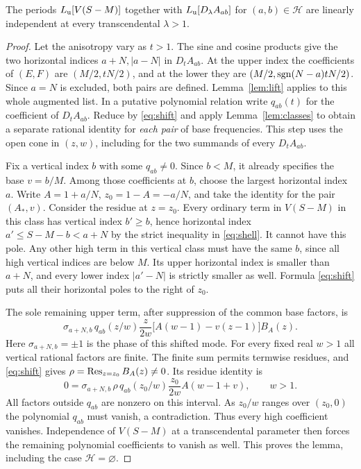 \begin{lemma}\label{lem:shell}
The periods $L_{\mathrm u}[V(S-M)]$ together with $L_{\mathrm u}[D_\lambda A_{ab}]$ for $(a,b)\in\mathcal H$ are linearly independent at every transcendental $\lambda>1$.
\end{lemma}
\begin{proof}
Let the anisotropy vary as $t>1$. The sine and cosine products give the two horizontal indices $a+N, |a-N|$ in $D_t A_{ab}$. At the upper index the coefficients of $(E,F)$ are $(M/2,tN/2)$, and at the lower they are $(M/2,\operatorname{sgn}(N-a)tN/2)$. Since $a=N$ is excluded, both pairs are defined. Lemma~\ref{lem:lift} applies to this whole augmented list. In a putative polynomial relation write $q_{ab}(t)$ for the coefficient of $D_t A_{ab}$. Reduce by \eqref{eq:shift} and apply Lemma~\ref{lem:classes} to obtain a separate rational identity for \emph{each pair} of base frequencies. This step uses the open cone in $(z,w)$, including for the two summands of every $D_t A_{ab}$.

Fix a vertical index $b$ with some $q_{ab}\ne0$. Since $b<M$, it already specifies the base $v=b/M$. Among those coefficients at $b$, choose the largest horizontal index $a$. Write $A=1+a/N$, $z_0=1-A=-a/N$, and take the identity for the pair $(A_*,v)$. Consider the residue at $z=z_0$. Every ordinary term in $V(S-M)$ in this class has vertical index $b'\ge b$, hence horizontal index $a'\le S-M-b<a+N$ by the strict inequality in \eqref{eq:shell}. It cannot have this pole. Any other high term in this vertical class must have the same $b$, since all high vertical indices are below $M$. Its upper horizontal index is smaller than $a+N$, and every lower index $|a'-N|$ is strictly smaller as well. Formula \eqref{eq:shift} puts all their horizontal poles to the right of $z_0$.

The sole remaining upper term, after suppression of the common base factors, is
\[
 \sigma_{a+N,b}\,q_{ab}(z/w)\frac{z}{2w}
        \bigl[A(w-1)-v(z-1)\bigr] B_A(z) .
\]
Here $\sigma_{a+N,b}=\pm1$ is the phase of this shifted mode. For every fixed real $w>1$ all vertical rational factors are finite. The finite sum permits termwise residues, and \eqref{eq:shift} gives $\rho=\operatorname{Res}_{z=z_0}B_A(z)\ne0$. Its residue identity is
\begin{equation}\label{eq:residue}
 0=\sigma_{a+N,b}\,\rho\,q_{ab}(z_0/w)\frac{z_0}{2w} A(w-1+v),\qquad w>1 .
\end{equation}
All factors outside $q_{ab}$ are nonzero on this interval. As $z_0/w$ ranges over $(z_0,0)$ the polynomial $q_{ab}$ must vanish, a contradiction. Thus every high coefficient vanishes. Independence of $V(S-M)$ at a transcendental parameter then forces the remaining polynomial coefficients to vanish as well. This proves the lemma, including the case $\mathcal H=\varnothing$.
\end{proof}

